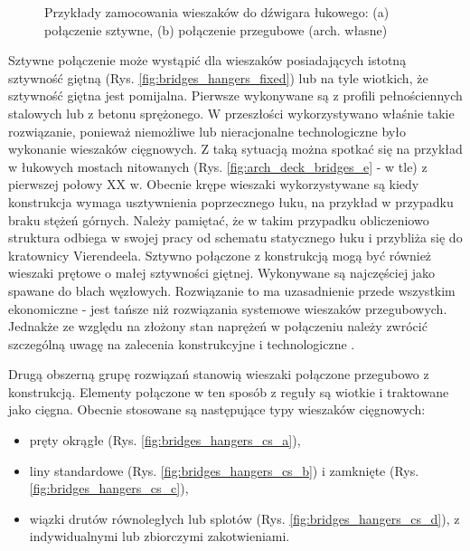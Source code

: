 \begin{figure}[hbt!]
	\centering
	\captionsetup{justification=centering}
	\caption{Przykłady zamocowania wieszaków do dźwigara łukowego: (a) połączenie sztywne, (b) połączenie przegubowe (arch. własne)}
	\label{fig:bridges_hangers_exp}
\end{figure}

Sztywne połączenie może wystąpić dla wieszaków posiadających istotną sztywność giętną (Rys. \ref{fig:bridges_hangers_fixed}) lub na tyle wiotkich, że sztywność giętna jest pomijalna. Pierwsze wykonywane są z profili pełnościennych stalowych lub z betonu sprężonego. W przeszłości wykorzystywano właśnie takie rozwiązanie, ponieważ niemożliwe lub nieracjonalne technologiczne było wykonanie wieszaków cięgnowych. Z taką sytuacją można spotkać się na przykład w łukowych mostach nitowanych (Rys. \ref{fig:arch_deck_bridges_e}  - w tle) z pierwszej połowy XX w. Obecnie krępe wieszaki wykorzystywane są kiedy konstrukcja wymaga usztywnienia poprzecznego łuku, na przykład w przypadku braku stężeń górnych. Należy pamiętać, że w takim przypadku obliczeniowo struktura odbiega w swojej pracy od schematu statycznego łuku i przybliża się do kratownicy Vierendeela. Sztywno połączone z konstrukcją mogą być również wieszaki prętowe o małej sztywności giętnej. Wykonywane są najczęściej jako spawane do blach węzłowych. Rozwiązanie to ma uzasadnienie przede wszystkim ekonomiczne - jest tańsze niż rozwiązania systemowe wieszaków przegubowych. Jednakże ze względu na złożony stan naprężeń w połączeniu należy zwrócić szczególną uwagę na zalecenia konstrukcyjne i technologiczne \parencite{Gunther2000,BundesanstaltfurWasserbauHg.2018,Szafranski2017}. 

Drugą obszerną grupę rozwiązań stanowią wieszaki połączone przegubowo z konstrukcją. Elementy połączone w ten sposób z reguły są wiotkie i traktowane jako cięgna. Obecnie stosowane są następujące typy wieszaków cięgnowych:
\begin{itemize}
	\item pręty okrągłe (Rys. \ref{fig:bridges_hangers_cs_a}),
	\item liny standardowe (Rys. \ref{fig:bridges_hangers_cs_b}) i zamknięte (Rys. \ref{fig:bridges_hangers_cs_c}),
	\item wiązki drutów równoległych lub splotów (Rys. \ref{fig:bridges_hangers_cs_d}), z indywidualnymi lub zbiorczymi zakotwieniami.
\end{itemize}

